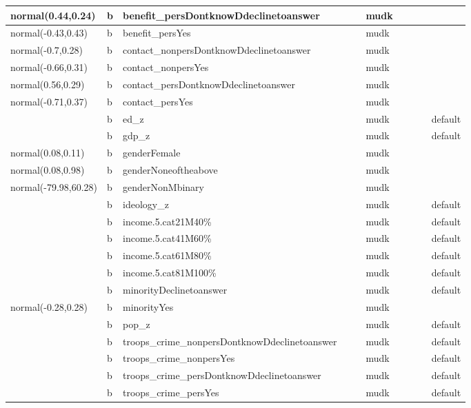 \documentclass[
]{book}
\theoremstyle{definition}
\theoremstyle{definition}
\theoremstyle{definition}
\theoremstyle{definition}
\theoremstyle{remark}
\begin{document}
\begin{table}
\begin{tabular}[t]{l|l|l|l|l|l|l|l|l|l}
normal(0.44,0.24) & b & benefit\_persDontknowDdeclinetoanswer &  &  & mudk &  &  &  & \\
\hline
normal(-0.43,0.43) & b & benefit\_persYes &  &  & mudk &  &  &  & \\
\hline
normal(-0.7,0.28) & b & contact\_nonpersDontknowDdeclinetoanswer &  &  & mudk &  &  &  & \\
\hline
normal(-0.66,0.31) & b & contact\_nonpersYes &  &  & mudk &  &  &  & \\
\hline
normal(0.56,0.29) & b & contact\_persDontknowDdeclinetoanswer &  &  & mudk &  &  &  & \\
\hline
normal(-0.71,0.37) & b & contact\_persYes &  &  & mudk &  &  &  & \\
\hline
 & b & ed\_z &  &  & mudk &  &  &  & default\\
\hline
 & b & gdp\_z &  &  & mudk &  &  &  & default\\
\hline
normal(0.08,0.11) & b & genderFemale &  &  & mudk &  &  &  & \\
\hline
normal(0.08,0.98) & b & genderNoneoftheabove &  &  & mudk &  &  &  & \\
\hline
normal(-79.98,60.28) & b & genderNonMbinary &  &  & mudk &  &  &  & \\
\hline
 & b & ideology\_z &  &  & mudk &  &  &  & default\\
\hline
 & b & income.5.cat21M40\% &  &  & mudk &  &  &  & default\\
\hline
 & b & income.5.cat41M60\% &  &  & mudk &  &  &  & default\\
\hline
 & b & income.5.cat61M80\% &  &  & mudk &  &  &  & default\\
\hline
 & b & income.5.cat81M100\% &  &  & mudk &  &  &  & default\\
\hline
 & b & minorityDeclinetoanswer &  &  & mudk &  &  &  & default\\
\hline
normal(-0.28,0.28) & b & minorityYes &  &  & mudk &  &  &  & \\
\hline
 & b & pop\_z &  &  & mudk &  &  &  & default\\
\hline
 & b & troops\_crime\_nonpersDontknowDdeclinetoanswer &  &  & mudk &  &  &  & default\\
\hline
 & b & troops\_crime\_nonpersYes &  &  & mudk &  &  &  & default\\
\hline
 & b & troops\_crime\_persDontknowDdeclinetoanswer &  &  & mudk &  &  &  & default\\
\hline
 & b & troops\_crime\_persYes &  &  & mudk &  &  &  & default\\

\end{tabular}
\end{table}
\end{document}
